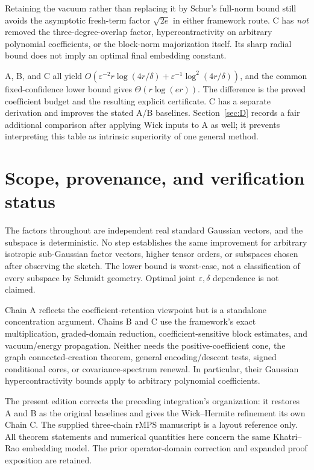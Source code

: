 \documentclass[11pt]{article}
\numberwithin{equation}{section}
\theoremstyle{definition}\newtheorem{definition}[theorem]{Definition}
\theoremstyle{remark}\newtheorem{remark}[theorem]{Remark}
\begin{document}
Retaining the vacuum rather than replacing it by Schur's full-norm bound
still avoids the asymptotic fresh-term factor $\sqrt{2e}$ in either framework
route. C has \emph{not} removed the three-degree-overlap factor, hypercontractivity
on arbitrary polynomial coefficients, or the block-norm majorization itself.
Its sharp radial bound does not imply an optimal final embedding constant.

\begin{takeaway}[title={Same endpoint, a distinguishable hybrid}]
A, B, and C all yield
$O(\varepsilon^{-2}r\log(4r/\delta)+\varepsilon^{-1}\log^2(4r/\delta))$,
and the common fixed-confidence lower bound gives $\Theta(r\log(er))$.
The difference is the proved coefficient budget and the resulting explicit
certificate. C has a separate derivation and improves the stated A/B baselines.
Section~\ref{sec:D} records a fair additional comparison after applying
Wick inputs to A as well; it prevents interpreting this table as intrinsic
superiority of one general method.
\end{takeaway}
\section{Scope, provenance, and verification status}\label{sec:scope}
The factors throughout are independent real standard Gaussian vectors, and the
subspace is deterministic. No step establishes the same improvement for arbitrary
isotropic sub-Gaussian factor vectors, higher tensor orders, or subspaces chosen
after observing the sketch. The lower bound is worst-case, not a classification
of every subspace by Schmidt geometry. Optimal joint $\varepsilon,\delta$
dependence is not claimed.

Chain A reflects the coefficient-retention viewpoint but is a standalone
concentration argument. Chains B and C use the framework's exact multiplication,
graded-domain reduction, coefficient-sensitive block estimates, and vacuum/energy
propagation. Neither needs the positive-coefficient cone, the graph
connected-creation theorem, general encoding/descent tests, signed conditional
cores, or covariance-spectrum renewal. In particular, their Gaussian
hypercontractivity bounds apply to arbitrary polynomial coefficients.

The present edition corrects the preceding integration's organization: it
restores A and B as the original baselines and gives the Wick--Hermite
refinement its own Chain C. The supplied three-chain rMPS manuscript is a
layout reference only. All theorem statements and numerical quantities here
concern the same Khatri--Rao embedding model. The prior operator-domain
correction and expanded proof exposition are retained.
\end{document}
